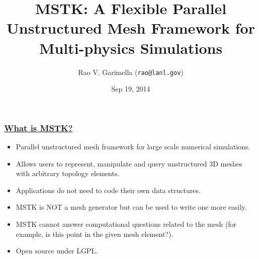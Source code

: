 \documentclass{beamer}
\begin{document}
%
 \renewcommand{\rmdefault}{ptm} %
 \renewcommand{\sfdefault}{phv} %

 \renewcommand{\ttdefault}{ptc} %
 \sffamily                      %
%
%
%
%

\bfseries  %
\small


\raggedright




\title{MSTK: A Flexible Parallel Unstructured Mesh Framework for Multi-physics Simulations} 


\author[Garimella]{Rao V. Garimella (\texttt{rao@lanl.gov})}
\date{Sep 19, 2014}

\begin{frame}
\thispagestyle{empty}
\titlepage
  \vfill
  \begin{center}
    \usebox{\lanllogo}
  \end{center}
\end{frame}


\begin{frame}
\frametitle{\underline{What is MSTK?}}

\begin{itemize}
\item Parallel unstructured mesh framework for large scale numerical simulations.
\item Allows users to represent, manipulate and query unstructured 3D meshes with arbitrary topology elements.
\item  Applications do not need to code their own data structures. 
\item MSTK is NOT a mesh generator but can be used to write one more easily. 
\item MSTK cannot answer computational
questions related to the mesh (for example, is this point in the given
mesh element?).
\item Open source under LGPL.
\end{itemize}
\end{frame}
\end{document}
